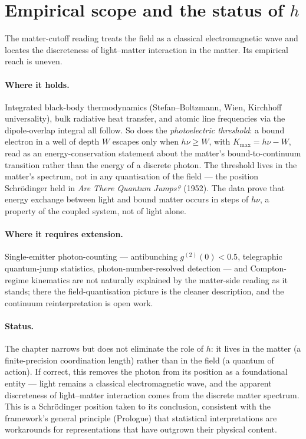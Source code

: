 \section{Empirical scope and the status of $h$}\label{sec:photoelectric-empirical}

The matter-cutoff reading treats the field as a classical electromagnetic wave and locates the discreteness of light--matter interaction in the matter. Its empirical reach is uneven.

\paragraph{Where it holds.}
Integrated black-body thermodynamics (Stefan--Boltzmann, Wien, Kirchhoff universality), bulk radiative heat transfer, and atomic line frequencies via the dipole-overlap integral all follow. So does the \emph{photoelectric threshold}: a bound electron in a well of depth $W$ escapes only when $h\nu \ge W$, with $K_{\max} = h\nu - W$, read as an energy-conservation statement about the matter's bound-to-continuum transition rather than the energy of a discrete photon. The threshold lives in the matter's spectrum, not in any quantisation of the field --- the position Schr\"odinger held in \emph{Are There Quantum Jumps?} (1952). The data prove that energy exchange between light and bound matter occurs in steps of $h\nu$, a property of the coupled system, not of light alone.

\paragraph{Where it requires extension.}
Single-emitter photon-counting --- antibunching $g^{(2)}(0) < 0.5$, telegraphic quantum-jump statistics, photon-number-resolved detection --- and Compton-regime kinematics are not naturally explained by the matter-side reading as it stands; there the field-quantisation picture is the cleaner description, and the continuum reinterpretation is open work.

\paragraph{Status.}
The chapter narrows but does not eliminate the role of $h$: it lives in the matter (a finite-precision coordination length) rather than in the field (a quantum of action). If correct, this removes the photon from its position as a foundational entity --- light remains a classical electromagnetic wave, and the apparent discreteness of light--matter interaction comes from the discrete matter spectrum. This is a Schr\"odinger position taken to its conclusion, consistent with the framework's general principle (Prologue) that statistical interpretations are workarounds for representations that have outgrown their physical content.

